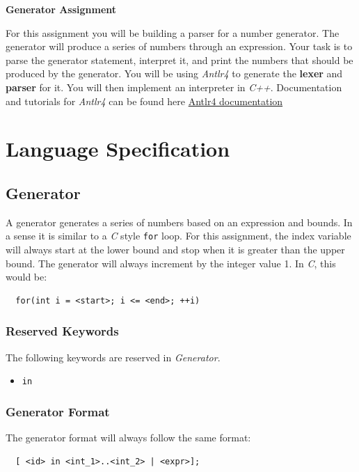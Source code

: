 \documentclass{article}
\newcommand{\code}[1]{\texttt{\textmd{#1}}}
\begin{document}
\ifpdf
  \LARGE
  \textbf{Generator Assignment}
  \normalsize
\fi

For this assignment you will be building a parser for a number generator. The generator will
produce a series of numbers through an expression. Your task is to parse the generator statement,
interpret it, and print the numbers that should be produced by the generator. You will be using
\textit{Antlr4} to generate the \textbf{lexer} and \textbf{parser} for it. You will
then implement an interpreter in \textit{C++}. Documentation and tutorials for \textit{Antlr4} can
be found here \href{https://github.com/antlr/antlr4/blob/master/doc/index.md}
{Antlr4 documentation}

\section{Language Specification}
\subsection{Generator}
A generator generates a series of numbers based on an expression and bounds. In a sense it is
similar to a \textit{C} style \code{for} loop. For this assignment, the index variable will always
start at the lower bound and stop when it is greater than the upper bound. The generator will
always increment by the integer value 1. In \textit{C}, this would be:
\begin{lstlisting}
  for(int i = <start>; i <= <end>; ++i)
\end{lstlisting}

\subsubsection{Reserved Keywords}
The following keywords are reserved in \textit{Generator}.
\begin{itemize}
  \item \code{in}
\end{itemize}

\subsubsection{Generator Format}
The generator format will always follow the same format:
\begin{lstlisting}
  [ <id> in <int_1>..<int_2> | <expr>];
\end{lstlisting}
\end{document}

